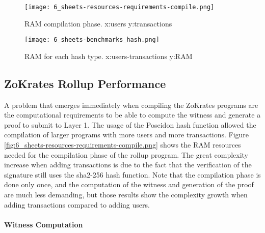 \begin{figure}
	\centering
	\begin{minipage}{.5\textwidth}
		\centering
		\texttt{[image: 6\_sheets-resources-requirements-compile.png]}
		\caption[RAM Compile]{RAM compilation phase. \newline x:users y:transactions}
		\label{fig:6_sheets-resources-requirements-compile.png}
	\end{minipage}%
	\begin{minipage}{.5\textwidth}
		\centering
		\texttt{[image: 6\_sheets-benchmarks\_hash.png]}
		\caption[RAM Usage hash]{RAM for each hash type. \newline x:users-transactions y:RAM}
		\label{fig:6_sheets-benchmarks_hash.png}
	\end{minipage}
\end{figure}

\subsection{ZoKrates Rollup Performance\label{subsec:6_zokratesperf}}

A problem that emerges immediately when compiling the ZoKrates programs are the computational requirements to be able to compute the witness and generate a proof to submit to Layer 1. The usage of the Poseidon hash function allowed the compilation of larger programs with more users and more transactions. Figure \ref{fig:6_sheets-resources-requirements-compile.png} shows the RAM resources needed for the compilation phase of the rollup program. The great complexity increase when adding transactions is due to the fact that the verification of the signature still uses the sha2-256 hash function. Note that the compilation phase is done only once, and the computation of the witness and generation of the proof are much less demanding, but those results show the complexity growth when adding transactions compared to adding users.

\paragraph{Witness Computation}

